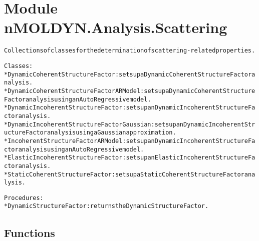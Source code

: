 %
%
%


\section{Module nMOLDYN.Analysis.Scattering}

    \label{nMOLDYN:Analysis:Scattering}
\begin{alltt}
Collections of classes for the determination of scattering-related properties.

Classes:
    * DynamicCoherentStructureFactor           : sets up a Dynamic Coherent Structure Factor analysis.
    * DynamicCoherentStructureFactorARModel    : sets up a Dynamic Coherent Structure Factor analysis using an Auto Regressive model.
    * DynamicIncoherentStructureFactor         : sets up an Dynamic Incoherent Structure Factor analysis.
    * DynamicIncoherentStructureFactorGaussian : sets up an Dynamic Incoherent Structure Factor analysis using a Gaussian approximation.
    * IncoherentStructureFactorARModel         : sets up an Dynamic Incoherent Structure Factor analysis using an Auto Regressive model.
    * ElasticIncoherentStructureFactor         : sets up an Elastic Incoherent Structure Factor analysis.
    * StaticCoherentStructureFactor            : sets up a Static Coherent Structure Factor analysis.
    
Procedures:
    * DynamicStructureFactor : returns the Dynamic Structure Factor.
\end{alltt}



  \subsection{Functions}

    \label{nMOLDYN:Analysis:Scattering:DynamicStructureFactor}

